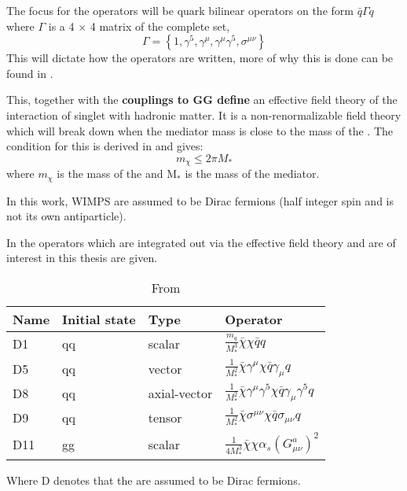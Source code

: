 The focus for the operators will be quark bilinear operators on the form $\bar{q}\Gamma q$ where $\Gamma$ is a 4 $\times$ 4 matrix of the complete set, 
\begin{equation}
\Gamma = \left\lbrace 1,\gamma ^5,\gamma ^\mu,\gamma ^\mu \gamma ^5, \sigma ^{\mu \nu} \right\rbrace
\end{equation}
This will dictate how the operators are written, more of why this is done can be found in \citep{82.116010,Goodman:2010,Zee:2003}.

This, together with the \textbf{couplings to GG define} an effective field theory of the interaction of singlet \abbrWIMPS with hadronic matter. It is a non-renormalizable field theory which will break down when the mediator mass is close to the mass of the \abbrWIMP .
The condition for this is derived in \citep{82.116010} and gives:
\begin{equation}
m_\chi \leqslant 2\pi M_*
\end{equation}
where $m_\chi$ is the mass of the \abbrWIMP and M$_*$ is the mass of the mediator. 

In this work, WIMPS are assumed to be Dirac fermions (half integer spin and is not its own antiparticle). 
 
In  the operators which are integrated out via the effective field theory and are of interest in this thesis are given.
\renewcommand{\arraystretch}{1.5} %
\begin{table}[H]
\begin{center}
    \begin{tabular}{ | l | l | l | l |}
    \hline
    Name & Initial state & Type & Operator \\ \hline
  	D1 & qq & scalar & $\frac{m_q}{M^3_*} \bar{\chi} \chi \bar{q} q$ \\ \hline
  	D5 & qq & vector & $\frac{1}{M^2_*} \bar{\chi} \gamma^\mu \chi \bar{q} \gamma_\mu q$ \\ \hline
  	D8 & qq & axial-vector & $\frac{1}{M^2_*}\bar{\chi}\gamma^\mu \gamma^5 \chi \bar{q} \gamma_\mu \gamma^5 q $ \\ \hline
  	D9 & qq & tensor & $\frac{1}{M^2_*} \bar{\chi}\sigma^{\mu \nu} \chi \bar{q} \sigma_{\mu \nu} q  $\\ \hline
  	D11 & gg & scalar & $\frac{1}{4M^3_*}\bar{\chi}\chi \alpha_s (G^a_{\mu \nu})^2 $\\ \hline
  	\end{tabular}

  	\caption{From \citep{CERN-PH-EP-2012-210}}
  	\label{tab:operators}
  	  	\end{center}
    \end{table}
\renewcommand{\arraystretch}{1.0}  %
Where D denotes that the \abbrWIMPS are assumed to be Dirac fermions.

